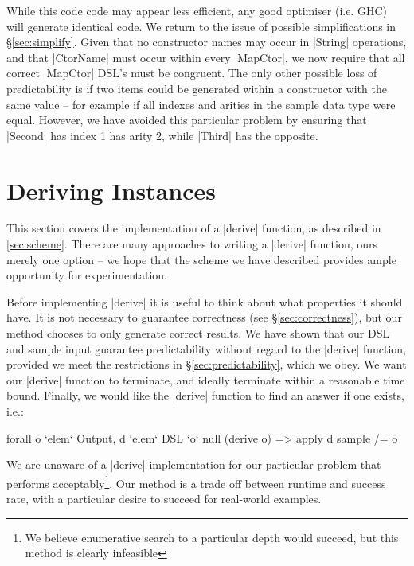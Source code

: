 \documentclass[preprint,draft]{sigplanconf}
\begin{document}
While this code code may appear less efficient, any good optimiser (i.e. GHC) will generate identical code. We return to the issue of possible simplifications in \S\ref{sec:simplify}. Given that no constructor names may occur in |String| operations, and that |CtorName| must occur within every |MapCtor|, we now require that all correct |MapCtor| DSL's must be congruent. The only other possible loss of predictability is if two items could be generated within a constructor with the same value -- for example if all indexes and arities in the sample data type were equal. However, we have avoided this particular problem by ensuring that |Second| has index 1 has arity 2, while |Third| has the opposite.


\section{Deriving Instances}
\label{sec:guess}

This section covers the implementation of a |derive| function, as described in \ref{sec:scheme}. There are many approaches to writing a |derive| function, ours merely one option -- we hope that the scheme we have described provides ample opportunity for experimentation.

Before implementing |derive| it is useful to think about what properties it should have. It is not necessary to guarantee correctness (see \S\ref{sec:correctness}), but our method chooses to only generate correct results. We have shown that our DSL and sample input guarantee predictability without regard to the |derive| function, provided we meet the restrictions in \S\ref{sec:predictability}, which we obey. We want our |derive| function to terminate, and ideally terminate within a reasonable time bound. Finally, we would like the |derive| function to find an answer if one exists, i.e.:

\ignore\begin{code}
forall o `elem` Output, d `elem` DSL `o` null (derive o) => apply d sample /= o
\end{code}

We are unaware of a |derive| implementation for our particular problem that performs acceptably\footnote{We believe enumerative search to a particular depth would succeed, but this method is clearly infeasible}. Our method is a trade off between runtime and success rate, with a particular desire to succeed for real-world examples.
\end{document}
